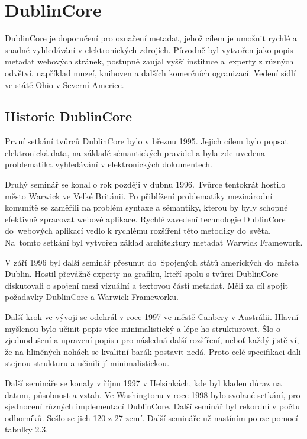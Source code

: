 \section{DublinCore}
\par DublinCore\cite{dublincoredocementation} je doporučení pro označení metadat, jehož cílem je umožnit rychlé a snadné vyhledávání v elektronických zdrojích. Původně byl vytvořen jako popis metadat webových stránek, postupně zaujal vyšší instituce a~experty z různých odvětví, například muzeí, knihoven a dalších komerčních ogranizací. Vedení sídlí ve státě Ohio v Severní Americe.

\subsection{Historie DublinCore}
\par První setkání tvůrců DublinCore\cite{dublincoredocementation} bylo v březnu 1995. Jejich cílem bylo popsat elektronická data, na základě sémantických pravidel a byla zde uvedena problematika vyhledávání v elektronických dokumentech.

\par Druhý seminář se konal o rok později v dubnu 1996. Tvůrce tentokrát hostilo město Warwick ve Velké Británii. Po přiblížení problematiky mezinárodní komunitě se zaměřili na problém syntaxe a sémantiky, kterou by byly schopné efektivně zpracovat webové aplikace. Rychlé zavedení technologie DublinCore do~webových aplikací vedlo k rychlému rozšíření této metodiky do~světa. Na~tomto setkání byl vytvořen základ architektury metadat Warwick Framework.

\par V září 1996 byl další seminář přesunut do~Spojených států amerických do~města Dublin. Hostil převážně experty na grafiku, kteří spolu s tvůrci DublinCore diskutovali o spojení mezi vizuální a textovou částí metadat. Měli za cíl spojit požadavky DublinCore a Warwick Frameworku.

\par Další krok ve vývoji se odehrál v roce 1997 ve městě Canbery v Austrálii. Hlavní myšlenou bylo učinit popis více minimalistický a lépe ho strukturovat. Šlo o zjednodušení a upravení popisu pro následná další rozšíření, neboť každý jistě ví, že na hliněných nohách se kvalitní barák postavit nedá. Proto celé specifikaci dali stejnou strukturu a učinili jí minimalistickou.

\par Další semináře se konaly v říjnu 1997 v Helsinkách, kde byl kladen důraz na datum, působnost a vztah. Ve Washingtonu v roce 1998 bylo svolané setkání, pro sjednocení různých implementací DublinCore. Další seminář byl rekordní v počtu odborníků. Sešlo se jich 120 z 27 zemí. Další semináře už nastíním pouze pomocí tabulky 2.3.


